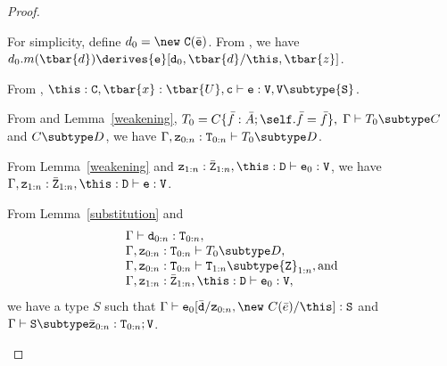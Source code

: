 \begin{proof}
\begin{itemize}
\begin{itemize}
            For simplicity, define $d_0 = \new\ {\tt C}(\bar{\tt e})$.
            From \RInvk, we have
            $d_0.m(\tbar{d}) \derives {\tt e}[{\tt d}_0,\tbar{d}/\this,\tbar{z}]$.

            From , 
        $\this: {\tt C}, \tbar{x}: \tbar{U}, {\tt c} \vdash {\tt e}: {\tt V}, {\tt V} \subtype {\tt S}$.


            From  and Lemma~\ref{weakening},
            $T_0 = C\{\bar{f}: \bar{A}; \self.\bar{f} = \bar{f}\},$ 
            $\Gamma \vdash T_0 \subtype C$ and
            $C \subtype D$, 
            we have
            $\Gamma, {\tt z}_{0:n}: {\tt T}_{0:n} \vdash T_0 \subtype D$.

            From Lemma~\ref{weakening} and
            ${\tt z}_{1:n}: \bar{\tt Z}_{1:n},\this: {\tt D} \vdash 
                  {\tt e}_0: {\tt V}$, 
            we have
            $\Gamma, {\tt z}_{1:n}: \bar{\tt Z}_{1:n},\this: {\tt D} \vdash 
                  {\tt e}: {\tt V}$.

            From Lemma~\ref{substitution} and
            $$
            \begin{array}{l}
            \Gamma \vdash {\tt d}_{0:n} : {\tt T}_{0:n}, \\
            \Gamma,{\tt z}_{0:n}: {\tt T}_{0:n} \vdash T_0 \subtype D, \\
            \Gamma, {\tt z}_{0:n}: {\tt T}_{0:n} \vdash
                  {\tt T}_{1:n} \subtype {\tt Z}_{1:n}, \mbox{and}\\
            \Gamma, {\tt z}_{1:n}: \bar{\tt Z}_{1:n},\this: {\tt D} \vdash 
                    {\tt e}_0: {\tt V}, \\
            \end{array}$$
            we have a type $S$ such that 
            $\Gamma \vdash
                 {\tt e}_0[\bar{\tt d}/{\tt z}_{0:n},\new\ C(\bar{e})/\this]: {\tt S}$ 
            and
            $\Gamma \vdash {\tt S} \subtype \bar{\tt z}_{0:n}: {\tt T}_{0:n};{\tt V}$.


\end{itemize}
\end{itemize}
\end{proof}
